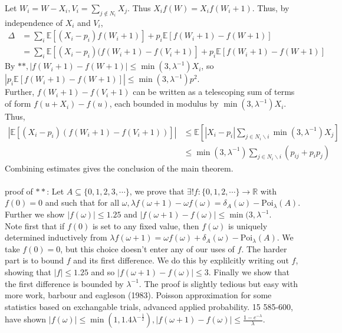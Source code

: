 \documentclass[12pt]{article}
\begin{document}
Let $W_i = W - X_i, V_i = \sum_{j \notin N_i}X_j$. Thus $X_if(W) = X_if(W_i + 1)$. Thus, by independence of $X_i$ and $V_i$,
\begin{align}
	\Delta &= \sum_i \mathbb{E}\left[(X_i - p_i)f(W_i + 1)\right] + p_i \mathbb{E}\left[f(W_i + 1) - f(W + 1)\right]\nonumber\\
					   &= \sum_i \mathbb{E}\left[(X_i - p_i)(f(W_i + 1) - f(V_i + 1)\right] + p_i\mathbb{E}\left[f(W_i + 1) - f(W + 1)\right]\nonumber
\end{align}
By $\ast\ast, |f(W_i + 1) - f(W + 1)| \leqslant \min(3, \lambda^{-1})X_i$, so $|p_i\mathbb{E}\left[f(W_i + 1) - f(W + 1)\right]| \leqslant \min(3, \lambda^{-1})p^2$.\\
Further, $f(W_i + 1) - f(V_i + 1)$ can be written as a telescoping sum of terms of form $f(u + X_i) - f(u)$, each bounded in modulus by $\min(3, \lambda^{-1})X_i$. Thus,
\begin{align}
	|\mathbb{E}\left[(X_i - p_i)(f(W_i + 1) - f(V_i + 1))\right]| &\leqslant \mathbb{E}\left[|X_i - p_i|\sum_{j \in N_i \backslash i}\min(3, \lambda^{-1})X_j\right]\nonumber\\
																																																											 &\leqslant \min(3, \lambda^{-1})\sum_{j \in N_i\backslash i}(p_{ij} + p_ip_j)\nonumber
\end{align}
Combining estimates gives the conclusion of the main theorem.\\
\\
proof of $\ast\ast$: Let $A \subseteq \{0, 1, 2, 3, \cdots\}$, we prove that $\exists ! f: \{0, 1, 2, \cdots\} \rightarrow \mathbb{R}$ with $f(0) = 0$ and such that for all $\omega, \lambda f(\omega + 1) - \omega f(\omega) = \delta_A(\omega) - \text{Poi}_{\lambda}(A)$.\\
Further we show $|f(\omega)| \leqslant 1.25$ and $|f(\omega + 1) - f(\omega)| \leqslant \min(3, \lambda^{-1}$.\\
Note first that if $f(0)$ is set to any fixed value, then $f(\omega)$ is uniquely determined inductively from $\lambda f(\omega + 1) = \omega f(\omega) + \delta_A(\omega) - \text{Poi}_{\lambda}(A)$. We take $f(0) = 0$, but this choice doesn't enter any of our uses of $f$. The harder part is to bound $f$ and its first difference. We do this by explilcitly writing out $f$, showing that $|f| \leqslant 1.25$ and so $|f(\omega + 1) - f(\omega)| \leqslant 3$. Finally we show that the first difference is bounded by $\lambda^{-1}$. The proof is slightly tedious but easy with more work, barbour and eagleson (1983). Poisson approximation for some statistics based on exchangable trials, advanced applied probability. 15 585-600, have shown $|f(\omega)| \leqslant \min(1, 1.4\lambda^{-\frac{1}{2}}), |f(\omega + 1) - f(\omega)| \leqslant \frac{1 - e^{-\lambda}}{\lambda}$.\\
\end{document}
